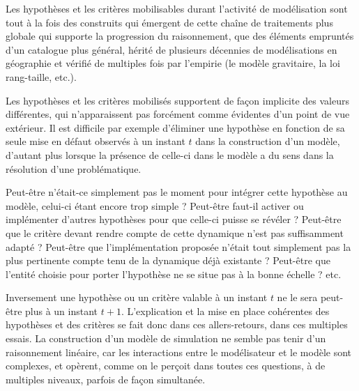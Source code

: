 Les hypothèses et les critères mobilisables durant l'activité de modélisation sont tout à la fois des construits qui émergent de cette chaîne de traitements plus globale qui supporte la progression du raisonnement, que des éléments empruntés d'un catalogue plus général, hérité de plusieurs décennies de modélisations en géographie et vérifié de multiples fois par l'empirie (le modèle gravitaire, la loi rang-taille, etc.).

Les hypothèses et les critères mobilisés supportent de façon implicite des valeurs différentes, qui n'apparaissent pas forcément comme évidentes d'un point de vue extérieur. Il est difficile par exemple d'éliminer une hypothèse en fonction de sa seule mise en défaut observés à un instant $t$ dans la construction d'un modèle, d'autant plus lorsque la présence de celle-ci dans le modèle a du sens dans la résolution d'une problématique.

Peut-être n'était-ce simplement pas le moment pour intégrer cette hypothèse au modèle, celui-ci étant encore trop simple ? Peut-être faut-il activer ou implémenter d'autres hypothèses pour que celle-ci puisse se révéler ? Peut-être que le critère devant rendre compte de cette dynamique n'est pas suffisamment adapté ? Peut-être que l'implémentation proposée n'était tout simplement pas la plus pertinente compte tenu de la dynamique déjà existante ? Peut-être que l'entité choisie pour porter l'hypothèse ne se situe pas à la bonne échelle ?  etc.

Inversement une hypothèse ou un critère valable à un instant $t$ ne le sera peut-être plus à un instant $t + 1$. L'explication et la mise en place cohérentes des hypothèses et des critères se fait donc dans ces allers-retours, dans ces multiples essais. La construction d'un modèle de simulation ne semble pas tenir d'un raisonnement linéaire, car les interactions entre le modélisateur et le modèle sont complexes, et opèrent, comme on le perçoit dans toutes ces questions, à de multiples niveaux, parfois de façon simultanée.

